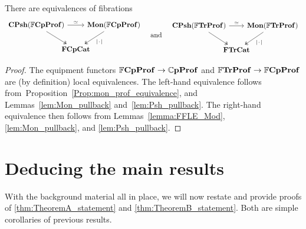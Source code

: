 \documentclass[11pt,oneside,article]{memoir}
\begin{document}
\begin{lemma}
      \label{lem:FrCompProf_Psh_Mon}
   There are equivalences of fibrations
   \begin{equation*}
      \begin{tikzcd}[column sep=-1.25em]
         \CPsh(\dFrCompProf) \ar[rr,"\equiv"] \ar[dr,two heads]
            && \Mon(\dFrCompProf) \ar[dl,two heads,"\MOb"] \\
            & \FrCompCat &
      \end{tikzcd}
      \quad\tn{and}\quad
        \begin{tikzcd}[column sep=-1.25em]
         \CPsh(\dFrTrProf) \ar[rr,"\equiv"] \ar[dr,two heads]
            && \Mon(\dFrTrProf) \ar[dl,two heads,"\MOb"] \\
            & \FrTrCat &
      \end{tikzcd}
   \end{equation*}
\end{lemma}
\begin{proof}
   The equipment functors $\mathbb{F}\mathbf{CpProf}\to\mathbb{C}\mathbf{pProf}$ and $\mathbb{F}\mathbf{TrProf}\to\mathbb{F}\mathbf{CpProf}$ are (by
   definition) local equivalences. The left-hand equivalence follows
   from~Proposition~\ref{Prop:mon_prof_equivalence}, and Lemmas~\ref{lem:Mon_pullback}
   and~\ref{lem:Psh_pullback}. The right-hand equivalence then follows from
   Lemmas~\ref{lemma:FFLE_Mod}, \ref{lem:Mon_pullback}, and \ref{lem:Psh_pullback}.
\end{proof}

\section{Deducing the main results}
      \label{sec:deducing}

With the background material all in place, we will now restate and provide proofs of
\ref{thm:TheoremA_statement} and \ref{thm:TheoremB_statement}. Both are simple corollaries of
previous results.
\end{document}
